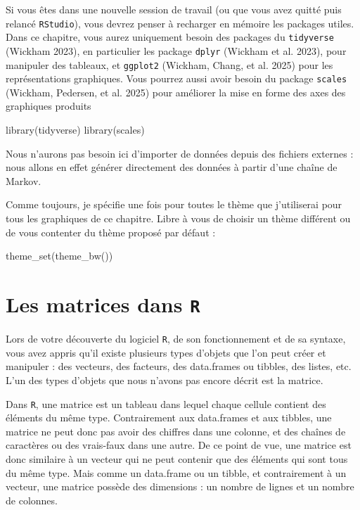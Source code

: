 \documentclass[
  french,
  a4paper,
  DIV=11,
  numbers=noendperiod,
  oneside]{scrreprt}
\newenvironment{Shaded}{}{}
\newcommand{\FunctionTok}[1]{\textcolor[rgb]{0.44,0.26,0.76}{#1}}
\newcommand{\NormalTok}[1]{\textcolor[rgb]{0.14,0.16,0.18}{#1}}
\begin{document}
\begin{tcolorbox}
Si vous êtes dans une nouvelle session de travail (ou que vous avez
quitté puis relancé \texttt{RStudio}), vous devrez penser à recharger en
mémoire les packages utiles. Dans ce chapitre, vous aurez uniquement
besoin des packages du \texttt{tidyverse} (Wickham 2023), en particulier
les package \texttt{dplyr} (Wickham et al. 2023), pour manipuler des
tableaux, et \texttt{ggplot2} ({Wickham, Chang, et al.} 2025) pour les
représentations graphiques. Vous pourrez aussi avoir besoin du package
\texttt{scales} (Wickham, Pedersen, et al. 2025) pour améliorer la mise
en forme des axes des graphiques produits

\begin{Shaded}
\begin{Highlighting}[]
\FunctionTok{library}\NormalTok{(tidyverse)}
\FunctionTok{library}\NormalTok{(scales)}
\end{Highlighting}
\end{Shaded}

Nous n'aurons pas besoin ici d'importer de données depuis des fichiers
externes : nous allons en effet générer directement des données à partir
d'une chaîne de Markov.

Comme toujours, je spécifie une fois pour toutes le thème que
j'utiliserai pour tous les graphiques de ce chapitre. Libre à vous de
choisir un thème différent ou de vous contenter du thème proposé par
défaut :

\begin{Shaded}
\begin{Highlighting}[]
\FunctionTok{theme\_set}\NormalTok{(}\FunctionTok{theme\_bw}\NormalTok{())}
\end{Highlighting}
\end{Shaded}

\section{\texorpdfstring{Les matrices dans
\texttt{R}}{Les matrices dans R}}\label{les-matrices-dans-r}

Lors de votre découverte du logiciel \texttt{R}, de son fonctionnement
et de sa syntaxe, vous avez appris qu'il existe plusieurs types d'objets
que l'on peut créer et manipuler : des vecteurs, des facteurs, des
data.frames ou tibbles, des listes, etc. L'un des types d'objets que
nous n'avons pas encore décrit est la matrice.

Dans \texttt{R}, une matrice est un tableau dans lequel chaque cellule
contient des éléments du même type. Contrairement aux data.frames et aux
tibbles, une matrice ne peut donc pas avoir des chiffres dans une
colonne, et des chaînes de caractères ou des vrais-faux dans une autre.
De ce point de vue, une matrice est donc similaire à un vecteur qui ne
peut contenir que des éléments qui sont tous du même type. Mais comme un
data.frame ou un tibble, et contrairement à un vecteur, une matrice
possède des dimensions : un nombre de lignes et un nombre de colonnes.


\end{tcolorbox}
\end{document}
